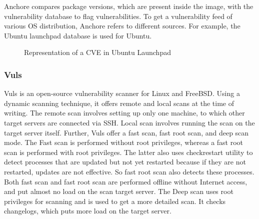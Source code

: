 \documentclass[a4paper,num-refs]{oup-contemporary}
\begin{document}
Anchore compares package versions, which are present inside the
image, with the vulnerability database to flag vulnerabilities.
To get a vulnerability feed of various OS distribution, Anchore refers to
different sources. For example, the Ubuntu launchpad database is used for Ubuntu.

\begin{figure}[H]
        \caption{\label{example} Representation of a CVE in Ubuntu Launchpad}
\end{figure}

\subsubsection{Vuls}

Vuls is an open-source vulnerability scanner for Linux and FreeBSD.
Using a dynamic scanning technique, it offers
remote and local scans at the time of writing. The remote scan involves setting up only one machine, to
which other target servers are connected via SSH. Local scan involves running
the scan on the target server itself. Further, Vuls offer a fast scan, fast root scan,
and deep scan mode.
The Fast scan is performed without root privileges, whereas a fast root scan is
performed with root privileges. The latter also uses checkrestart utility to 
detect processes that are updated but not yet restarted because if they are not
restarted, updates are not effective. So fast root scan also detects these
processes. Both fast scan and fast root scan are performed offline without Internet
access, and put almost no load on the scan target server. The Deep scan uses
root privileges for scanning and is used to get a more detailed scan. It checks
changelogs, which puts more load on the target server.
\end{document}
